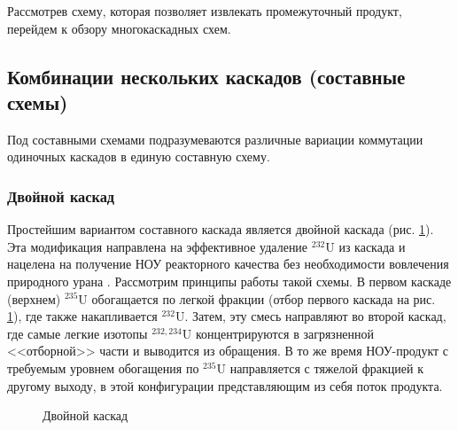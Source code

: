 Рассмотрев схему, которая позволяет извлекать промежуточный продукт, перейдем к обзору многокаскадных схем.

\subsection{Комбинации нескольких каскадов (составные схемы)}\label{sec:ch1/sec2.3}
Под составными схемами подразумеваются различные вариации коммутации одиночных каскадов в единую составную схему.

\subsubsection{Двойной каскад}

Простейшим вариантом составного каскада является двойной каскада (рис. \ref{fig:double_ru}).
Эта модификация направлена на эффективное удаление $^{232}$U из каскада и нацелена на получение НОУ реакторного качества без необходимости вовлечения природного урана \cite{SosninYuChelcov, TehnicheskieResheniyaPo}.
Рассмотрим принципы работы такой схемы.
В первом каскаде (верхнем) $^{235}$U обогащается по легкой фракции (отбор первого каскада на рис. \ref{fig:double_ru}), где также накапливается $^{232}$U.
Затем, эту смесь направляют во второй каскад, где самые легкие изотопы $^{232,234}$U концентрируются в загрязненной <<отборной>> части и выводится из обращения.
В то же время НОУ-продукт с требуемым уровнем обогащения по $^{235}$U направляется с тяжелой фракцией к другому выходу, в этой конфигурации представляющим из себя поток продукта.
\begin{figure}[ht]
  \caption{Двойной каскад}\label{fig:double_ru}
\end{figure}

